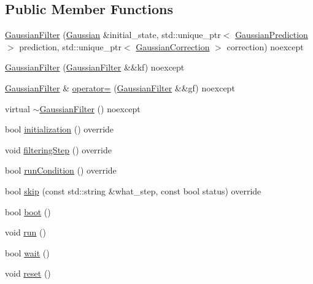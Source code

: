 \subsection*{Public Member Functions}
\begin{DoxyCompactItemize}
\item 
\mbox{\hyperlink{classbfl_1_1GaussianFilter_a480ea4178578324e2805f93884b718f1}{Gaussian\+Filter}} (\mbox{\hyperlink{classbfl_1_1Gaussian}{Gaussian}} \&initial\+\_\+state, std\+::unique\+\_\+ptr$<$ \mbox{\hyperlink{classbfl_1_1GaussianPrediction}{Gaussian\+Prediction}} $>$ prediction, std\+::unique\+\_\+ptr$<$ \mbox{\hyperlink{classbfl_1_1GaussianCorrection}{Gaussian\+Correction}} $>$ correction) noexcept
\item 
\mbox{\hyperlink{classbfl_1_1GaussianFilter_a322f9780479ab3c841f417e496783c9b}{Gaussian\+Filter}} (\mbox{\hyperlink{classbfl_1_1GaussianFilter}{Gaussian\+Filter}} \&\&kf) noexcept
\item 
\mbox{\hyperlink{classbfl_1_1GaussianFilter}{Gaussian\+Filter}} \& \mbox{\hyperlink{classbfl_1_1GaussianFilter_a9ce91b240bd88f83a6eba8f01e4b34eb}{operator=}} (\mbox{\hyperlink{classbfl_1_1GaussianFilter}{Gaussian\+Filter}} \&\&gf) noexcept
\item 
virtual \mbox{\hyperlink{classbfl_1_1GaussianFilter_a1d8226f8fe6f3f87ef0b71cc0579968f}{$\sim$\+Gaussian\+Filter}} () noexcept
\item 
bool \mbox{\hyperlink{classbfl_1_1GaussianFilter_ac0305fa835af89ba5962ee1211d4d0c0}{initialization}} () override
\item 
void \mbox{\hyperlink{classbfl_1_1GaussianFilter_ae30a175454a93685eca79d3ef857f7bc}{filtering\+Step}} () override
\item 
bool \mbox{\hyperlink{classbfl_1_1GaussianFilter_acf6902f6156c573560b57f10c1992b8a}{run\+Condition}} () override
\item 
bool \mbox{\hyperlink{classbfl_1_1GaussianFilter_a3ca79ee1451863d898baeea6a74ababd}{skip}} (const std\+::string \&what\+\_\+step, const bool status) override
\item 
bool \mbox{\hyperlink{classbfl_1_1FilteringAlgorithm_a96651f8464190c0a56d79219a1017147}{boot}} ()
\item 
void \mbox{\hyperlink{classbfl_1_1FilteringAlgorithm_a009cbe5f4bbb16967f6c6ddcaed8fbb1}{run}} ()
\item 
bool \mbox{\hyperlink{classbfl_1_1FilteringAlgorithm_a40372c24fa050eb0274371172df0a244}{wait}} ()
\item 
void \mbox{\hyperlink{classbfl_1_1FilteringAlgorithm_a2403c62fbd7bd7f5cda56a84f5f30331}{reset}} ()

\end{DoxyCompactItemize}
